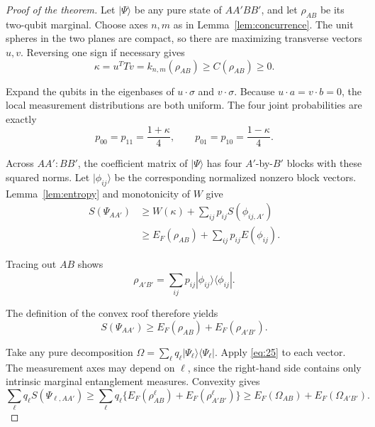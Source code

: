 \documentclass[10pt,letterpaper]{article}
\begin{document}
\begin{proof}[Proof of the theorem]
Let \(|\Psi\rangle\) be any pure state of \(AA'BB'\), and let \(\rho_{AB}\) be its two-qubit marginal. Choose axes \(n,m\) as in Lemma~\ref{lem:concurrence}. The unit spheres in the two planes are compact, so there are maximizing transverse vectors \(u,v\). Reversing one sign if necessary gives
\begin{equation*}
\kappa=u^TTv=k_{n,m}(\rho_{AB})\ge C(\rho_{AB})\ge0.
\end{equation*}

Expand the qubits in the eigenbases of \(u\cdot\sigma\) and \(v\cdot\sigma\). Because \(u\cdot a=v\cdot b=0\), the local measurement distributions are both uniform. The four joint probabilities are exactly
\begin{equation}
p_{00}=p_{11}=\frac{1+\kappa}4,\qquad
p_{01}=p_{10}=\frac{1-\kappa}4.
\label{eq:23}
\end{equation}

Across \(AA':BB'\), the coefficient matrix of \(|\Psi\rangle\) has four \(A'\)-by-\(B'\) blocks with these squared norms. Let \(|\phi_{ij}\rangle\) be the corresponding normalized nonzero block vectors. Lemma~\ref{lem:entropy} and monotonicity of \(W\) give
\begin{equation}
\begin{aligned}
S(\Psi_{AA'})&\ge W(\kappa)+\sum_{ij}p_{ij}S(\phi_{ij,A'})\\
&\ge E_F(\rho_{AB})+\sum_{ij}p_{ij}E(\phi_{ij}).
\end{aligned}
\label{eq:24}
\end{equation}

Tracing out \(AB\) shows
\begin{equation*}
\rho_{A'B'}=\sum_{ij}p_{ij}|\phi_{ij}\rangle\langle\phi_{ij}|.
\end{equation*}

The definition of the convex roof therefore yields
\begin{equation}
S(\Psi_{AA'})\ge E_F(\rho_{AB})+E_F(\rho_{A'B'}).
\label{eq:25}
\end{equation}

Take any pure decomposition \(\Omega=\sum_\ell q_\ell|\Psi_\ell\rangle\langle\Psi_\ell|\). Apply \eqref{eq:25} to each vector. The measurement axes may depend on \(\ell\), since the right-hand side contains only intrinsic marginal entanglement measures. Convexity gives
\begin{equation*}
\sum_\ell q_\ell S(\Psi_{\ell,AA'})
\ge\sum_\ell q_\ell\{E_F(\rho^\ell_{AB})+E_F(\rho^\ell_{A'B'})\}
\ge E_F(\Omega_{AB})+E_F(\Omega_{A'B'}).
\end{equation*}


\end{proof}
\end{document}
